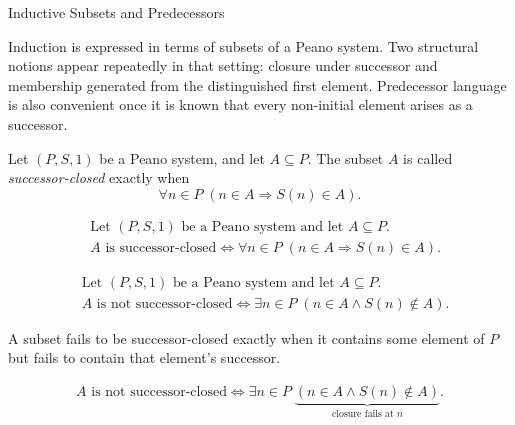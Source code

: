 \begin{topicbox}{Inductive Subsets and Predecessors}
\begin{exposition}
Induction is expressed in terms of subsets of a Peano system. Two structural
notions appear repeatedly in that setting: closure under successor and
membership generated from the distinguished first element. Predecessor language
is also convenient once it is known that every non-initial element arises as a
successor.
\end{exposition}

\begin{tcolorbox}[colback=defbox, colframe=defborder, arc=2pt,
  left=6pt, right=6pt, top=4pt, bottom=4pt,
  title={\small\textbf{Definition (Successor-Closed Subset)}} ,
  fonttitle=\small\bfseries]
\begin{definition}
\label{def:successor-closed-subset}
Let $(P,S,1)$ be a Peano system, and let $A \subseteq P$. The subset $A$ is
called \emph{successor-closed} exactly when
\[
\forall n \in P\;(n \in A \Longrightarrow S(n) \in A).
\]
\end{definition}
\end{tcolorbox}

\begin{remark*}
\[
\begin{aligned}
&\text{Let } (P,S,1) \text{ be a Peano system and let } A \subseteq P.\\
&A \text{ is successor-closed}
\Longleftrightarrow
\forall n \in P\;(n \in A \Longrightarrow S(n) \in A).
\end{aligned}
\]
\end{remark*}

\begin{remark*}
\[
\begin{aligned}
&\text{Let } (P,S,1) \text{ be a Peano system and let } A \subseteq P.\\
&A \text{ is not successor-closed}
\Longleftrightarrow
\exists n \in P\;(n \in A \land S(n) \notin A).
\end{aligned}
\]
\end{remark*}

\begin{remark*}
A subset fails to be successor-closed exactly when it contains some element of
$P$ but fails to contain that element's successor.
\end{remark*}

\begin{remark*}
\[
\begin{aligned}
A \text{ is not successor-closed}
\Longleftrightarrow
\exists n \in P\;\underbrace{(n \in A \land S(n) \notin A)}_{\text{closure fails at } n}.
\end{aligned}
\]
\end{remark*}


\end{topicbox}
